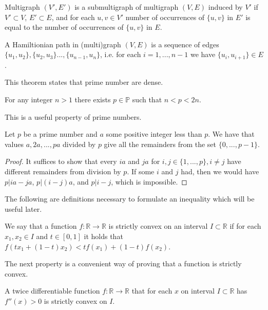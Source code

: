 \begin{defn}
Multigraph $(V', E')$ is a submultigraph of multigraph $(V,E)$ induced by $V'$
if $V' \subset V$, $E' \subset E$, and for each $u,v \in V'$ 
number of occurrences of $\{u,v\}$ in $E'$ is equal to the number of occurrences of $\{u,v\}$ in $E$.
\end{defn}

\begin{defn}
A Hamiltionian path in (multi)graph $(V,E)$
is a sequence of edges $\{u_1, u_2\}, \{u_2, u_3\} ..., \{u_{n-1}, u_n\}$,
i.e. for each $i=1,...,n-1$ we have $\{u_i, u_{i+1}\} \in E$.
\end{defn}


This theorem states that prime number are dense.

\begin{thm} \label{bertrand-chebyshev}
For any integer $n>1$ there exists $p \in \mathbb{P}$ such that $n < p < 2n$.
\end{thm}

This is a useful property of prime numbers.

\begin{thm} \label{zp}
Let $p$ be a prime number and $a$ some positive integer less than $p$.
We have that values $a, 2a, ..., pa$ divided by $p$ give all the remainders from the set $\{0, ..., p-1\}$.
\end{thm}

\begin{proof}
It suffices to show that every $ia$ and $ja$ for $i,j \in \{1, ..., p\}, i \neq j$
have different remainders from division by $p$.
If some $i$ and $j$ had, then we would have $p | ia - ja$, $p | (i-j)a$, and $p | i-j$, which is impossible.
\end{proof}

The following are definitions necessary to formulate an inequality which will be useful later.

\begin{defn}
We say that a function $f:\mathbb{R}\rightarrow\mathbb{R}$ is strictly convex on an interval $I \subset \mathbb{R}$
if for each $x_1, x_2 \in I$ and $t \in [0,1]$ it holds that $f(t x_1 + (1-t) x_2) < tf(x_1) + (1-t)f(x_2)$.
\end{defn}

The next property is a convenient way of proving that a function is strictly convex.

\begin{prp}
A twice differentiable function $f:\mathbb{R}\rightarrow\mathbb{R}$
that for each $x$ on interval $I \subset \mathbb{R}$ has $f''(x) > 0$
is strictly convex on $I$.
\end{prp}


